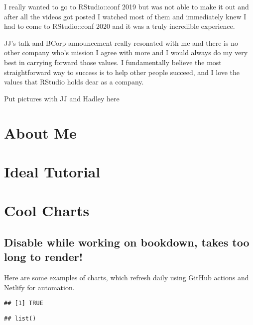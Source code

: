 \documentclass[
]{book}
\begin{document}
I really wanted to go to RStudio::conf 2019 but was not able to make it out and after all the videos got posted I watched most of them and immediately knew I had to come to RStudio::conf 2020 and it was a truly incredible experience.

JJ's talk and BCorp announcement really resonated with me and there is no other company who's mission I agree with more and I would always do my very best in carrying forward those values. I fundamentally believe the most straightforward way to success is to help other people succeed, and I love the values that RStudio holds dear as a company.

Put pictures with JJ and Hadley here

\hypertarget{about-me}{%
\chapter{About Me}\label{about-me}}

\hypertarget{ideal-tutorial}{%
\chapter{Ideal Tutorial}\label{ideal-tutorial}}

\hypertarget{cool-charts}{%
\chapter{Cool Charts}\label{cool-charts}}

\hypertarget{disable-while-working-on-bookdown-takes-too-long-to-render}{%
\section{Disable while working on bookdown, takes too long to render!}\label{disable-while-working-on-bookdown-takes-too-long-to-render}}

Here are some examples of charts, which refresh daily using GitHub actions and Netlify for automation.

\begin{verbatim}
## [1] TRUE
\end{verbatim}

\begin{verbatim}
## list()
\end{verbatim}

  
\end{document}
